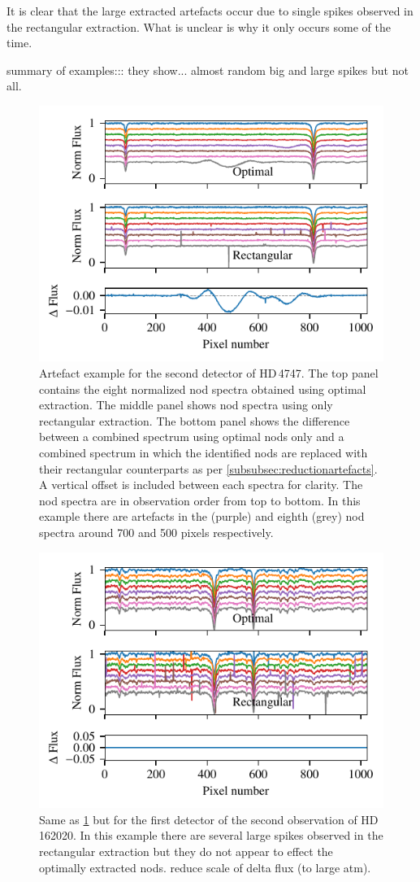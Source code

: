 It is clear that the large extracted artefacts occur due to single spikes observed in the rectangular extraction.
What is unclear is why it only occurs some of the time.

summary of examples::: they show...  almost random big and large spikes but not all.



 \begin{figure}
     \centering
     \includegraphics[width=0.7\linewidth]{figures/appendix/bp_plots/extraction_comparision_HD4747-1_chip_2}
     \caption{Artefact example for the second detector of {HD\,4747}.  The top panel contains the eight normalized nod spectra obtained using optimal extraction.
The middle panel shows nod spectra using only rectangular extraction.
The bottom panel shows the difference between a combined spectrum using optimal nods only and a combined spectrum in which the identified nods are replaced with their rectangular counterparts as per \cref{subsubsec:reductionartefacts}.
A vertical offset is included between each spectra for clarity.
The nod spectra are in observation order from top to bottom.
In this example there are artefacts in the  (purple) and eighth (grey) nod spectra around 700 and 500 pixels respectively.}
     \label{fig:artefact_example1}
 \end{figure}
 \begin{figure}
     \centering
     \includegraphics[width=0.7\linewidth]{figures/appendix/bp_plots/extraction_comparision_HD162020-2_chip_1}
     \caption{Same as \cref{fig:artefact_example1} but for the first detector of the second observation of {HD\,162020}.
In this example there are several large spikes observed in the rectangular extraction but they do not appear to effect the optimally extracted nods. {\red{} reduce scale of delta flux (to large atm)}.}
     \label{fig:artefact_example2}
 \end{figure}
